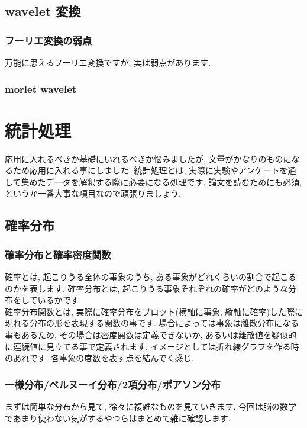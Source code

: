\documentclass[11pt,a4paper]{jreport}
\begin{document}
\section{wavelet 変換}
\subsection{フーリエ変換の弱点}
万能に思えるフーリエ変換ですが, 実は弱点があります.
\subsection{morlet wavelet}









\chapter{統計処理}
応用に入れるべきか基礎にいれるべきか悩みましたが, 文量がかなりのものになるため応用に入れる事にしました. 統計処理とは, 実際に実験やアンケートを通して集めたデータを解釈する際に必要になる処理です. 論文を読むためにも必須, というか一番大事な項目なので頑張りましょう.
\section{確率分布}
\subsection{確率分布と確率密度関数}
確率とは, 起こりうる全体の事象のうち, ある事象がどれくらいの割合で起こるのかを表します. 確率分布とは, 起こりうる事象それぞれの確率がどのような分布をしているかです. \\
確率分布関数とは, 実際に確率分布をプロット(横軸に事象, 縦軸に確率)した際に現れる分布の形を表現する関数の事です. 場合によっては事象は離散分布になる事もあるため, その場合は密度関数は定義できないか, あるいは離散値を疑似的に連続値に見立てる事で定義されます. イメージとしては折れ線グラフを作る時のあれです. 各事象の度数を表す点を結んでく感じ.\\

\subsection{一様分布/ベルヌーイ分布/2項分布/ポアソン分布}
まずは簡単な分布から見て, 徐々に複雑なものを見ていきます. 今回は脳の数学であまり使わない気がするやつらはまとめて雑に確認します.\\
\end{document}

